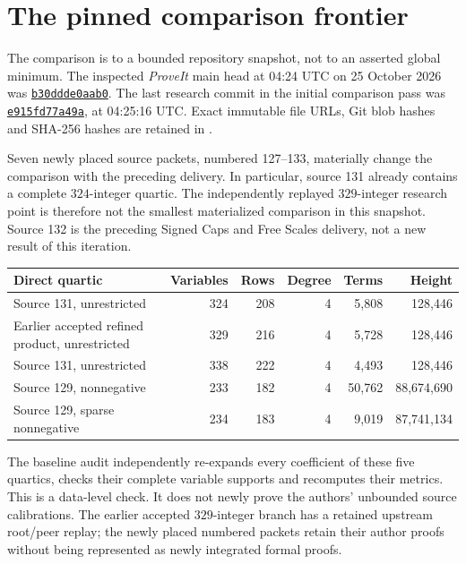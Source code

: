 \section{The pinned comparison frontier}
The comparison is to a bounded repository snapshot, not to an asserted global
minimum. The inspected \emph{ProveIt} main head at 04:24 UTC on 25 October 2026 was
\href{https://github.com/VladimirReshetnikov/ProveIt/commit/b30ddde0aab0ffc9687ec915234370ff916f052f}{\texttt{b30ddde0aab0}}.
The last research commit in the initial comparison pass was
\href{https://github.com/VladimirReshetnikov/ProveIt/commit/e915fd77a49a891d725afdf14844d825ece668b5}{\texttt{e915fd77a49a}},
at 04:25:16 UTC. Exact immutable file URLs, Git blob hashes and SHA-256
hashes are retained in .

Seven newly placed source packets, numbered 127--133, materially change the
comparison with the preceding delivery. In particular, source 131 already
contains a complete $324$-integer quartic. The independently replayed
$329$-integer research point is therefore not the smallest materialized
comparison in this snapshot. Source 132 is the preceding Signed Caps and
Free Scales delivery, not a new result of this iteration.

\begin{center}\small
\begin{tabular}{lrrrrr}
\toprule
Direct quartic & Variables & Rows & Degree & Terms & Height\\
\midrule
Source 131, unrestricted &324&208&4&5,808&128,446\\
Earlier accepted refined product, unrestricted &329&216&4&5,728&128,446\\
Source 131, unrestricted &338&222&4&4,493&128,446\\
Source 129, nonnegative &233&182&4&50,762&88,674,690\\
Source 129, sparse nonnegative &234&183&4&9,019&87,741,134\\
\bottomrule
\end{tabular}
\end{center}
The baseline audit independently re-expands every coefficient of these five
quartics, checks their complete variable supports and recomputes their metrics.
This is a data-level check. It does not newly prove the authors' unbounded
source calibrations. The earlier accepted $329$-integer branch has a retained upstream
root/peer replay; the newly placed numbered packets retain their author proofs
without being represented as newly integrated formal proofs.

